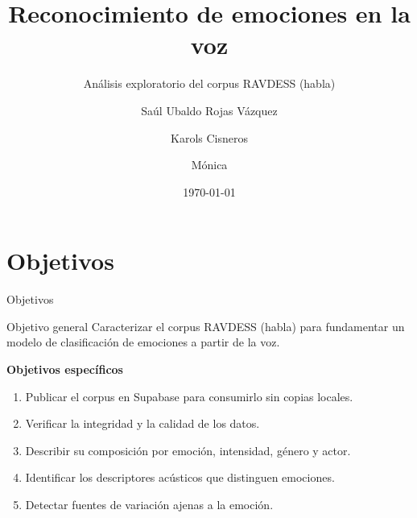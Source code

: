 \documentclass[aspectratio=169,11pt]{beamer}
\title{Reconocimiento de emociones en la voz}
\subtitle{Análisis exploratorio del corpus RAVDESS (habla)}
\author{Saúl Ubaldo Rojas Vázquez \and Karols Cisneros \and Mónica}
\date{\today}
\begin{document}
\begin{frame}[plain]
  \titlepage
\end{frame}

\section{Objetivos}
\begin{frame}{Objetivos}
  \begin{block}{Objetivo general}
    Caracterizar el corpus RAVDESS (habla) para fundamentar un modelo de clasificación de emociones a
    partir de la voz.
  \end{block}
  \vspace{0.6em}
  \textbf{Objetivos específicos}
  \begin{enumerate}
    \item Publicar el corpus en Supabase para consumirlo sin copias locales.
    \item Verificar la integridad y la calidad de los datos.
    \item Describir su composición por emoción, intensidad, género y actor.
    \item Identificar los descriptores acústicos que distinguen emociones.
    \item Detectar fuentes de variación ajenas a la emoción.
  \end{enumerate}
\end{frame}

\end{document}
